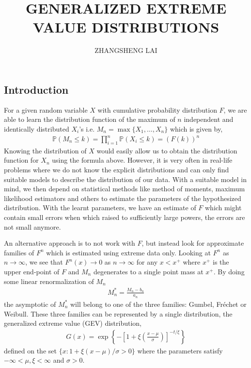 \documentclass[a4paper,10pt]{article}
\theoremstyle{definition}
\begin{document}
\title{\large \bf GENERALIZED EXTREME VALUE DISTRIBUTIONS}
\author{\small ZHANGSHENG LAI}
\date{}
\maketitle

\subsection*{Introduction}

For a given random variable $X$ with cumulative probability distribution $F$, we are able to learn the distribution function of the maximum of $n$ independent and identically distributed $X_i$'s i.e. $M_n = \max\{X_1,\ldots, X_n\}$ which is given by,
\begin{align*}
\mathbb{P}(M_n\leq k) = \prod_{i=1}^{n}\mathbb{P}(X_i \leq k) = \left(F(k)\right)^n
\end{align*}
Knowing the distribution of $X$ would easily allow us to obtain the distribution function for $X_n$ using the formula above. However, it is very often in real-life problems where we do not know the explicit distributions and can only find suitable models to describe the distribution of our data. With a suitable model in mind, we then depend on statistical methods like method of moments, maximum likelihood estimators and others to estimate the parameters of the hypothesized distribution. With the learnt parameters, we have an estimate of $F$ which might contain small errors when which raised to sufficiently large powers, the errors are not small anymore. 

An alternative approach is to not work with $F$, but instead look for approximate families of $F^n$ which is estimated using extreme data only. Looking at $F^n$ as $n \to \infty$, we see that $F^n(x) \to 0$ as $n \to \infty$ for any $x < x^+$ where $x^+$ is the upper end-point of $F$ and $M_n$ degenerates to a single point mass at $x^+$. By doing some linear renormalization of $M_n$
\begin{align*}
M_n^\ast = \frac{M_n-b_n}{a_n}
\end{align*}
the asymptotic of $M_n^\ast$ will belong to one of the three families: Gumbel, Fr\'echet or Weibull. These three families can be represented by a single distribution, the generalized extreme value (GEV) distribution,
\begin{align*}
G(x) = \exp \left\{-\left[1+\xi\left(\frac{x-\mu}{\sigma}\right)\right]^{-t/\xi}\right\}
\end{align*}
defined on the set $\{x : 1 + \xi(x-\mu)/\sigma>0\}$ where the parameters satisfy $-\infty<\mu, \xi<\infty$ and $\sigma >0$.
\end{document}
